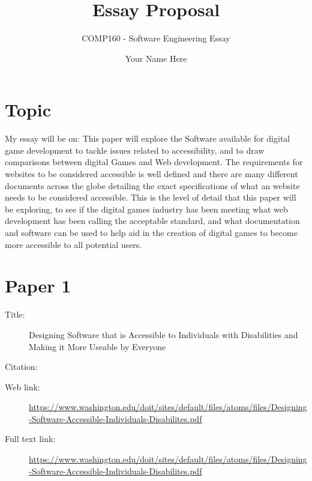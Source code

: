 \documentclass{scrartcl}
\title{Essay Proposal}
\subtitle{COMP160 - Software Engineering Essay}
\author{Your Name Here}
\begin{document}
\maketitle

\section*{Topic}

My essay will be on:
This paper will explore the Software available for digital game development to tackle issues related to accessibility, and to draw comparisons between digital Games and Web development. The requirements for websites to be considered accessible is well defined and there are many different documents across the globe detailing the exact specifications of what an website needs to be considered accessible. This is  the level of detail that this paper will be exploring, to see if the digital games industry has been meeting what web development has been calling the acceptable standard, and what documentation and software can be used to help aid in the creation of digital games to become more accessible to all potential users.

\section*{Paper 1}
\begin{description}
\item[Title:] Designing Software that is Accessible to Individuals with Disabilities and Making it More Useable by Everyone
\item[Citation:] \cite{Sheryl Burgstahler, Ph.D.}
\item[Web link:] \url{https://www.washington.edu/doit/sites/default/files/atoms/files/Designing-Software-Accessible-Individuals-Disabilites.pdf}
\item[Full text link:] \url{https://www.washington.edu/doit/sites/default/files/atoms/files/Designing-Software-Accessible-Individuals-Disabilites.pdf}
\end{description}
\end{document}
